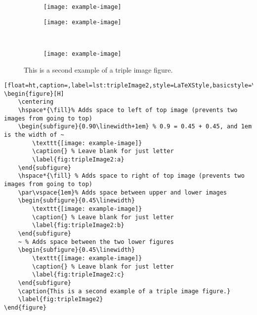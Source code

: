 		\vspace*{\fill}
		\begin{figure}[H]
			\centering
			\hspace*{\fill}%
			\begin{subfigure}{0.60\linewidth+1em} %
				\texttt{[image: example-image]}
				\caption{} %
				\label{fig:tripleImage2:a}
			\end{subfigure}
			\hspace*{\fill} %
			\par\vspace{1em}%
			\begin{subfigure}{0.30\linewidth}
				\texttt{[image: example-image]}
				\caption{} %
				\label{fig:tripleImage2:b}
			\end{subfigure}
			~ %
			\begin{subfigure}{0.30\linewidth}
				\texttt{[image: example-image]}
				\caption{} %
				\label{fig:tripleImage2:c}
			\end{subfigure}
			\caption{This is a second example of a triple image figure.}
			\label{fig:tripleImage2}
		\end{figure}
		\begin{lstlisting}[float=ht,caption=,label=lst:tripleImage2,style=LaTeXStyle,basicstyle=\tiny\ttfamily,]
\begin{figure}[H]
	\centering
	\hspace*{\fill}% Adds space to left of top image (prevents two images from going to top)
	\begin{subfigure}{0.90\linewidth+1em} % 0.9 = 0.45 + 0.45, and 1em is the width of ~
		\texttt{[image: example-image]}
		\caption{} % Leave blank for just letter
		\label{fig:tripleImage2:a}
	\end{subfigure}
	\hspace*{\fill} % Adds space to right of top image (prevents two images from going to top)
	\par\vspace{1em}% Adds space between upper and lower images
	\begin{subfigure}{0.45\linewidth}
		\texttt{[image: example-image]}
		\caption{} % Leave blank for just letter
		\label{fig:tripleImage2:b}
	\end{subfigure}
	~ % Adds space between the two lower figures
	\begin{subfigure}{0.45\linewidth}
		\texttt{[image: example-image]}
		\caption{} % Leave blank for just letter
		\label{fig:tripleImage2:c}
	\end{subfigure}
	\caption{This is a second example of a triple image figure.}
	\label{fig:tripleImage2}
\end{figure}
		\end{lstlisting}
